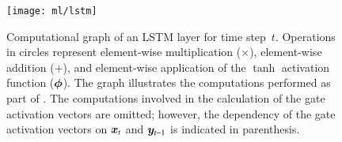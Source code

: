 \begin{figure}[htbp]
  \centering

  \texttt{[image: ml/lstm]}

  \caption[Computational graph of an LSTM layer.]{Computational graph of an LSTM
    layer for time step~$t$. Operations in circles represent element-wise
    multiplication ($\times$), element-wise addition ($+$), and element-wise
    application of the $\tanh$ activation function ($\bm{\phi}$). The graph
    illustrates the computations performed as part of
    . The computations involved in the
    calculation of the gate activation vectors are omitted; however, the
    dependency of the gate activation vectors on $\bm{x}_{t}$ and
    $\bm{y}_{t - 1}$ is indicated in parenthesis.}%
  \label{fig:lstm}
\end{figure}



